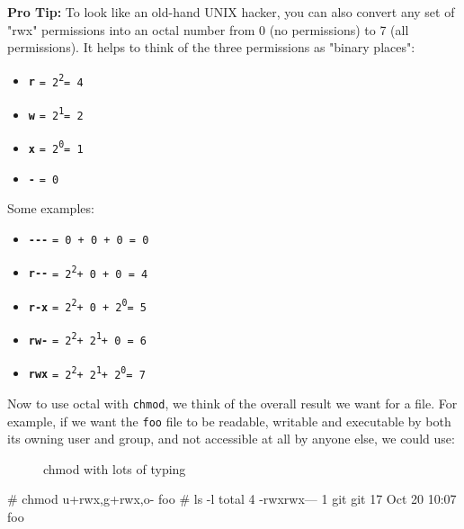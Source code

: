 \documentclass[10pt,american,]{book}
\newenvironment{Shaded}{\begin{snugshade}}{\end{snugshade}}
\newcommand{\KeywordTok}[1]{\textcolor[rgb]{0.13,0.29,0.53}{\textbf{{#1}}}}
\newcommand{\CommentTok}[1]{\textcolor[rgb]{0.56,0.35,0.01}{\textit{{#1}}}}
\newcommand{\NormalTok}[1]{{#1}}
\providecommand{\tightlist}{%
  \setlength{\itemsep}{0pt}\setlength{\parskip}{0pt}}
\numberwithin{figure}{chapter}
\DeclareRobustCommand{\drcap}[1]{\begin{figure}[H]\caption{#1}\end{figure}}
\renewcommand{\KeywordTok}[1]{{#1}}
\renewcommand{\CommentTok}[1]{{#1}}
\renewcommand{\NormalTok}[1]{{#1}}
\begin{document}
\textbf{Pro Tip:} To look like an old-hand UNIX hacker, you can also
convert any set of "rwx" permissions into an octal number from 0 (no
permissions) to 7 (all permissions). It helps to think of the three
permissions as "binary places":

\begin{itemize}
\tightlist
\item
  \textbf{\texttt{r}}
  \texttt{=\ 2}\textsuperscript{\texttt{2}}\texttt{=\ 4}
\item
  \textbf{\texttt{w}}
  \texttt{=\ 2}\textsuperscript{\texttt{1}}\texttt{=\ 2}
\item
  \textbf{\texttt{x}}
  \texttt{=\ 2}\textsuperscript{\texttt{0}}\texttt{=\ 1}
\item
  \textbf{\texttt{-}} \texttt{=\ 0}
\end{itemize}

Some examples:

\begin{itemize}
\tightlist
\item
  \textbf{\texttt{-\/-\/-}} \texttt{=\ 0\ +\ 0\ +\ 0\ =\ 0}
\item
  \textbf{\texttt{r-\/-}}
  \texttt{=\ 2}\textsuperscript{\texttt{2}}\texttt{+\ 0\ +\ 0\ =\ 4}
\item
  \textbf{\texttt{r-x}}
  \texttt{=\ 2}\textsuperscript{\texttt{2}}\texttt{+\ 0\ +\ 2}\textsuperscript{\texttt{0}}\texttt{=\ 5}
\item
  \textbf{\texttt{rw-}}
  \texttt{=\ 2}\textsuperscript{\texttt{2}}\texttt{+\ 2}\textsuperscript{\texttt{1}}\texttt{+\ 0\ =\ 6}
\item
  \textbf{\texttt{rwx}}
  \texttt{=\ 2}\textsuperscript{\texttt{2}}\texttt{+\ 2}\textsuperscript{\texttt{1}}\texttt{+\ 2}\textsuperscript{\texttt{0}}\texttt{=\ 7}
\end{itemize}

Now to use octal with \texttt{chmod}, we think of the overall result we
want for a file. For example, if we want the \texttt{foo} file to be
readable, writable and executable by both its owning user and group, and
not accessible at all by anyone else, we could use:

\drcap{chmod with lots of typing}

\begin{Shaded}
\begin{Highlighting}[]
\CommentTok{# chmod u+rwx,g+rwx,o- foo}
\CommentTok{# ls -l}
\KeywordTok{total} \NormalTok{4}
\KeywordTok{-rwxrwx---} \NormalTok{1 git git 17 Oct 20 10:07 foo}
\end{Highlighting}
\end{Shaded}
\end{document}
